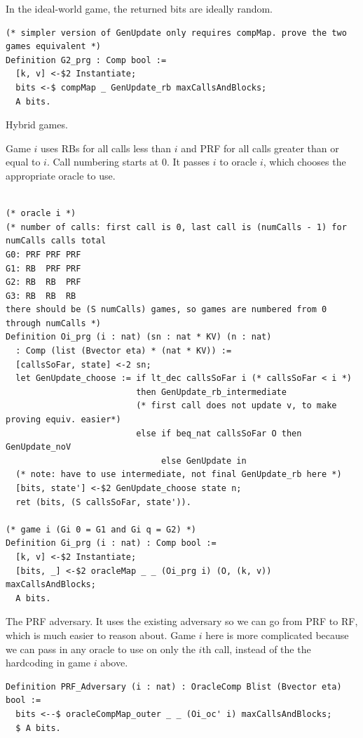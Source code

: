 \documentclass[12pt,lot, lof]{puthesis}
\begin{document}
{In the ideal-world game, the returned bits are ideally random.

\begin{lstlisting}
(* simpler version of GenUpdate only requires compMap. prove the two games equivalent *)
Definition G2_prg : Comp bool :=
  [k, v] <-$2 Instantiate;
  bits <-$ compMap _ GenUpdate_rb maxCallsAndBlocks;
  A bits.
\end{lstlisting}

Hybrid games. 

Game $i$ uses RBs for all calls less than $i$ and PRF for all calls greater than or equal to $i$. Call numbering starts at $0$. It passes $i$ to oracle $i$, which chooses the appropriate oracle to use.

\begin{lstlisting}

(* oracle i *)
(* number of calls: first call is 0, last call is (numCalls - 1) for numCalls calls total
G0: PRF PRF PRF
G1: RB  PRF PRF
G2: RB  RB  PRF
G3: RB  RB  RB 
there should be (S numCalls) games, so games are numbered from 0 through numCalls *)
Definition Oi_prg (i : nat) (sn : nat * KV) (n : nat)
  : Comp (list (Bvector eta) * (nat * KV)) :=
  [callsSoFar, state] <-2 sn;
  let GenUpdate_choose := if lt_dec callsSoFar i (* callsSoFar < i *)
                          then GenUpdate_rb_intermediate
                          (* first call does not update v, to make proving equiv. easier*)
                          else if beq_nat callsSoFar O then GenUpdate_noV
                               else GenUpdate in
  (* note: have to use intermediate, not final GenUpdate_rb here *)
  [bits, state'] <-$2 GenUpdate_choose state n;
  ret (bits, (S callsSoFar, state')).

(* game i (Gi 0 = G1 and Gi q = G2) *)
Definition Gi_prg (i : nat) : Comp bool :=
  [k, v] <-$2 Instantiate;
  [bits, _] <-$2 oracleMap _ _ (Oi_prg i) (O, (k, v)) maxCallsAndBlocks;
  A bits.
\end{lstlisting}  

The PRF adversary. It uses the existing adversary so we can go from PRF to RF, which is much easier to reason about. Game $i$ here is more complicated because we can pass in any oracle to use on only the $i$th call, instead of the the hardcoding in game $i$ above. 

\begin{lstlisting}
Definition PRF_Adversary (i : nat) : OracleComp Blist (Bvector eta) bool :=
  bits <--$ oracleCompMap_outer _ _ (Oi_oc' i) maxCallsAndBlocks;
  $ A bits.


\end{lstlisting}}
\end{document}

